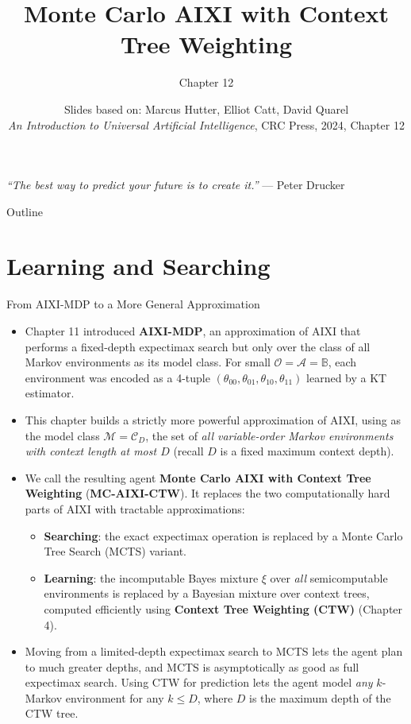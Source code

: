 \documentclass[aspectratio=169,10pt]{beamer}
\title[Ch.\ 12: MC-AIXI-CTW]{Monte Carlo AIXI with Context Tree Weighting}
\subtitle{Chapter 12}
\author{Slides based on: Marcus Hutter, Elliot Catt, David Quarel\\
\textit{An Introduction to Universal Artificial Intelligence}, CRC Press, 2024, Chapter 12}
\date{}
\newcommand{\BB}{\mathbb{B}}
\newcommand{\Acal}{\mathcal{A}}
\newcommand{\Ocal}{\mathcal{O}}
\newcommand{\Mcal}{\mathcal{M}}
\newcommand{\CD}{\mathcal{C}_D}
\begin{document}
\begin{frame}
\titlepage
\begin{center}
\small\textit{``The best way to predict your future is to create it.''} --- Peter Drucker
\end{center}
\end{frame}

\begin{frame}{Outline}
\tableofcontents
\end{frame}

\section{Learning and Searching}

\begin{frame}[allowframebreaks]{From AIXI-MDP to a More General Approximation}
\begin{itemize}
\item Chapter 11 introduced \textbf{AIXI-MDP}, an approximation of AIXI that performs a
fixed-depth expectimax search but only over the class of all Markov environments as its
model class. For small $\Ocal=\Acal=\BB$, each environment was encoded as a 4-tuple
$(\theta_{00},\theta_{01},\theta_{10},\theta_{11})$ learned by a KT estimator.
\item This chapter builds a strictly more powerful approximation of AIXI, using as the
model class $\Mcal=\CD$, the set of \emph{all variable-order Markov environments with
context length at most $D$} (recall $D$ is a fixed maximum context depth).
\item We call the resulting agent \textbf{Monte Carlo AIXI with Context Tree Weighting}
(\textbf{MC-AIXI-CTW}). It replaces the two computationally hard parts of AIXI with
tractable approximations:
\begin{itemize}
\item \textbf{Searching}: the exact expectimax operation is replaced by a Monte Carlo
Tree Search (MCTS) variant.
\item \textbf{Learning}: the incomputable Bayes mixture $\xi$ over \emph{all}
semicomputable environments is replaced by a Bayesian mixture over context trees,
computed efficiently using \textbf{Context Tree Weighting (CTW)} (Chapter 4).
\end{itemize}
\item Moving from a limited-depth expectimax search to MCTS lets the agent plan to much
greater depths, and MCTS is asymptotically as good as full expectimax search. Using CTW
for prediction lets the agent model \emph{any} $k$-Markov environment for any $k\le D$,
where $D$ is the maximum depth of the CTW tree.
\end{itemize}
\end{frame}
\end{document}
